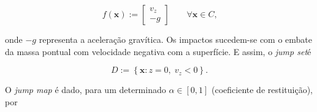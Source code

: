 \vspace{-0.75em}
$$
    f(\pmb{x}) := \begin{bmatrix} v_z \\ -g \end{bmatrix}\qquad \forall \pmb{x} \in C\text{,}
$$

\vspace{0em}
\noindent onde $-g$ representa a aceleração gravítica. Os impactos sucedem-se com o embate da massa pontual com velocidade negativa com a superfície. E assim, o \textit{jump set}\footnotemark[2] é

\vspace{-1em}
$$
    D := \left\{ \pmb{x}: z = 0,\; v_z < 0 \right\}.
$$

\vspace{-0.25em}
\noindent O \textit{jump map} é dado, para um determinado $\alpha \in [0, 1]$ (coeficiente de restituição), por

